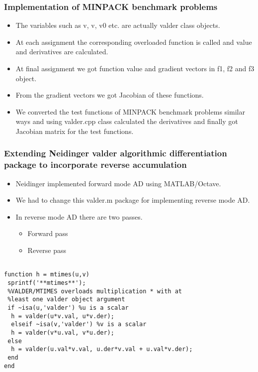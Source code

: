 \documentclass[10pt]{beamer}
\begin{document}

\begin{frame}
\frametitle{Implementation of MINPACK benchmark problems}
\begin{itemize}
\item The variables such as v, v, v0 etc. are actually valder class objects.
\item  At each assignment the corresponding overloaded function is called and value and derivatives are calculated.
\item At final assignment we got function value and gradient vectors in f1, f2 and f3 object.
\item From the gradient vectors we got Jacobian of these functions.
\item We converted the test functions of MINPACK benchmark problems similar ways and using valder.cpp class calculated the derivatives and finally got Jacobian matrix for the test functions.

\end{itemize}
\end{frame}

\begin{frame}
\frametitle{Extending Neidinger valder algorithmic differentiation package to incorporate reverse accumulation}
\begin{itemize}
\item Neidinger implemented forward mode AD using MATLAB/Octave.
\item We had to change this valder.m package for implementing reverse mode AD.
\item In reverse mode AD there are two passes.\begin{itemize}
\item  Forward pass
\item Reverse pass
\end{itemize} 


\end{itemize}
\end{frame}

\begin{lrbox}{\codebox}
\begin{lstlisting}

function h = mtimes(u,v)
 sprintf('**mtimes**');
 %VALDER/MTIMES overloads multiplication * with at  
 %least one valder object argument
 if ~isa(u,'valder') %u is a scalar
  h = valder(u*v.val, u*v.der);
  elseif ~isa(v,'valder') %v is a scalar
  h = valder(v*u.val, v*u.der);
 else
  h = valder(u.val*v.val, u.der*v.val + u.val*v.der);
 end
end      
\end{lstlisting}
\end{lrbox}
\end{document}
